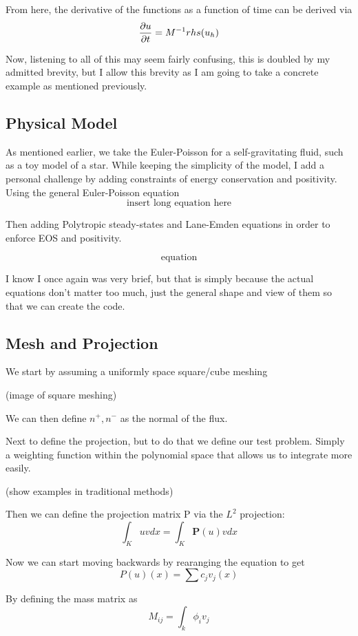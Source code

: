 From here, the derivative of the functions as a function of time can be derived via
\[
	\pdv{u}{t} = M^{-1}rhs(u_h)
\]

Now, listening to all of this may seem fairly confusing, this is doubled by my admitted brevity, but I allow this brevity as I am going to take a concrete example as mentioned previously.

\subsection{Physical Model}

As mentioned earlier, we take the Euler-Poisson for a self-gravitating fluid, such as a toy model of a star. While keeping the simplicity of the model, I add a personal challenge by adding constraints of energy conservation and positivity. Using the general Euler-Poisson equation
\[
	\text{insert long equation here}
\]

Then adding Polytropic steady-states and Lane-Emden equations in order to enforce EOS and positivity.

\[
	\text{equation}
\]

I know I once again was very brief, but that is simply because the actual equations don't matter too much, just the general shape and view of them so that we can create the code.

\subsection{Mesh and Projection}


We start by assuming a uniformly space square/cube meshing

(image of square meshing)

We can then define $n^+, n^-$ as the normal of the flux.

Next to define the projection, but to do that we define our test problem. Simply a weighting function within the polynomial space that allows us to integrate more easily.

(show examples in traditional methods)

Then we can define the projection matrix P via the $L^2$ projection:
\[
	\int_K u v dx = \int_K \mathbf{P}(u) v dx
\]

Now we can start moving backwards by rearanging the equation to get
\[
	P(u)(x) = \sum c_j v_j(x)
\]

By defining the mass matrix as
\[
	M_{ij} = \int_k \phi_i v_j
\]

